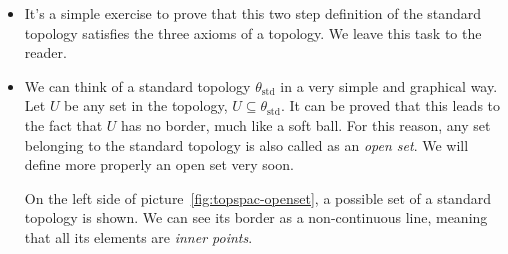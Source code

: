 \begin{itemize}
\begin{figure}[ht]
    \caption{%
      To the left a soft ball $B_r(\vvv{p})$ is represented.
      The one on the right is not a soft ball.}
    \label{fig:topspac-softball-closedball}
  \end{figure}

\item It's a simple exercise to prove that this two step definition of the
  standard topology satisfies the three axioms of a topology. We leave this
  task to the reader.
  
\item We can think of a standard topology $\theta_{\text{std}}$ in a very
  simple and graphical way.
  Let $U$ be any set in the topology, $U\subseteq\theta_{\text{std}}$. It can
  be proved that this leads to the fact that $U$ has no border, much like a
  soft ball. For this reason, any set belonging to the standard topology is
  also called as an \emph{open set}.
  We will define more properly an open set very soon.

  On the left side of picture~\ref{fig:topspac-openset}, a possible set of a
  standard topology is shown. We can see its border as a non-continuous line,
  meaning that all its elements are \emph{inner points}.
  

\end{itemize}
